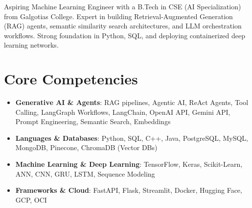 \documentclass[11pt,a4paper,sans]{moderncv}
\begin{document}
\makecvtitle

\vspace{6pt}
\small{Aspiring Machine Learning Engineer with a B.Tech in CSE (AI Specialization) from Galgotias College. Expert in building Retrieval-Augmented Generation (RAG) agents, semantic similarity search architectures, and LLM orchestration workflows. Strong foundation in Python, SQL, and deploying containerized deep learning networks.}

\section{Core Competencies}
\vspace{1pt}
\begin{itemize}
\item \textbf{Generative AI \& Agents}: RAG pipelines, Agentic AI, ReAct Agents, Tool Calling, LangGraph Workflows, LangChain, OpenAI API, Gemini API, Prompt Engineering, Semantic Search, Embeddings
\item \textbf{Languages \& Databases}: Python, SQL, C++, Java, PostgreSQL, MySQL, MongoDB, Pinecone, ChromaDB (Vector DBs)
\item \textbf{Machine Learning \& Deep Learning}: TensorFlow, Keras, Scikit-Learn, ANN, CNN, GRU, LSTM, Sequence Modeling
\item \textbf{Frameworks \& Cloud}: FastAPI, Flask, Streamlit, Docker, Hugging Face, GCP, OCI
\end{itemize}
\end{document}
